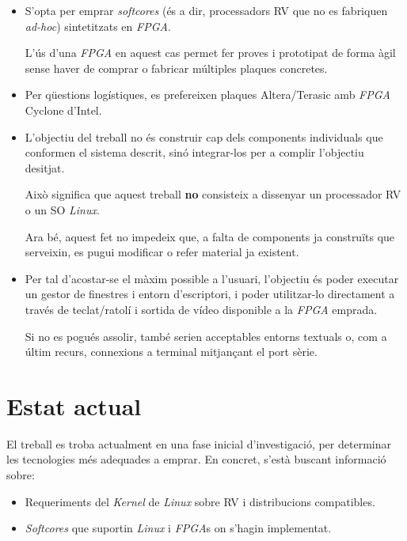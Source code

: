 \documentclass{article}
\begin{document}
\begin{itemize}
\item S'opta per emprar \textit{softcores} (és a dir, processadors RV que no es fabriquen \textit{ad-hoc}) sintetitzats en \textit{FPGA}.

L'ús d'una \textit{FPGA} en aquest cas permet fer proves i prototipat de forma àgil sense haver de comprar o fabricar múltiples plaques concretes.

\item Per qüestions logístiques, es prefereixen plaques Altera/Terasic amb \textit{FPGA} Cyclone d'Intel.

\item L'objectiu del treball no és construir cap dels components individuals que conformen el sistema descrit, sinó integrar-los per a complir l'objectiu desitjat.

Això significa que aquest treball \textbf{no} consisteix a dissenyar un processador RV o un SO \textit{Linux}.

Ara bé, aquest fet no impedeix que, a falta de components ja construïts que serveixin, es pugui modificar o refer material ja existent.

\item Per tal d'acostar-se el màxim possible a l'usuari, l'objectiu és poder executar un gestor de finestres i entorn d'escriptori, i poder utilitzar-lo directament a través de teclat/ratolí i sortida de vídeo disponible a la \textit{FPGA} emprada.

Si no es pogués assolir, també serien acceptables entorns textuals o, com a últim recurs, connexions a terminal mitjançant el port sèrie.

\end{itemize}

\section{Estat actual}

El treball es troba actualment en una fase inicial d'investigació, per determinar les tecnologies més adequades a emprar. En concret, s'està buscant informació sobre:

\begin{itemize}
\item Requeriments del \textit{Kernel} de \textit{Linux} sobre RV i distribucions compatibles.
\item \textit{Softcores} que suportin \textit{Linux} i \textit{FPGA}s on s'hagin implementat.
\end{itemize}
\end{document}
